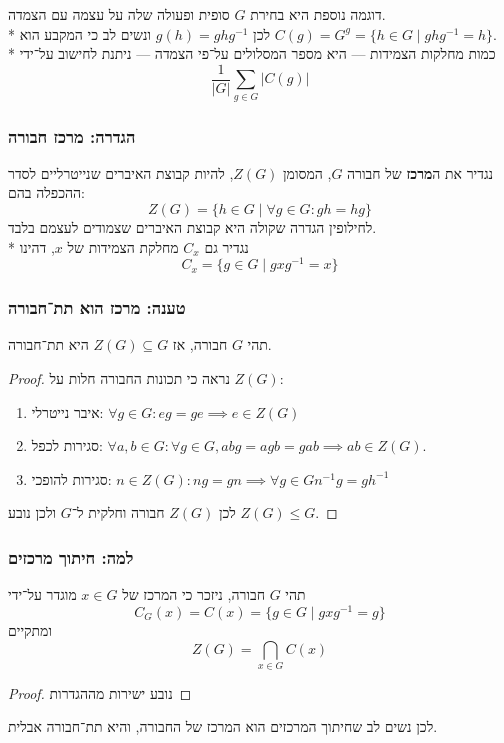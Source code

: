 דוגמה נוספת היא בחירת $G$ סופית ופעולה שלה על עצמה עם הצמדה. \\*
לכן $g(h) = ghg^{-1}$ ונשים לב כי המקבע הוא $C(g) = G^g = \{ h \in G \mid ghg^{-1} = h\}$. \\*
כמות מחלקות הצמידות --- היא מספר המסלולים על־פי הצמדה --- ניתנת לחישוב על־ידי
\[
	\frac{1}{|G|} \sum_{g \in G} |C(g)|
\]

\subsubsection{הגדרה: מרכז חבורה}
נגדיר את ה\textbf{מרכז} של חבורה $G$, המסומן $Z(G)$, להיות קבוצת האיברים שנייטרליים לסדר ההכפלה בהם:
\[
	Z(G) = \{ h \in G \mid \forall g \in G : g h = h g\}
\]
לחילופין הגדרה שקולה היא קבוצת האיברים שצמודים לעצמם בלבד. \\*
נגדיר גם $C_x$ מחלקת הצמידות של $x$, דהינו
\[
	C_x = \{ g \in G \mid g x g^{-1} = x \}
\]

\subsubsection{טענה: מרכז הוא תת־חבורה}
תהי $G$ חבורה, אז $Z(G) \subseteq G$ היא תת־חבורה.
\begin{proof}
	נראה כי תכונות החבורה חלות על $Z(G)$:
	\begin{enumerate}
		\item איבר נייטרלי: $\forall g \in G: eg = ge \implies e \in Z(G)$
		\item סגירות לכפל: $\forall a, b \in G : \forall g \in G, a b g = a g b = g a b \implies ab \in Z(G)$.
		\item סגירות להופכי: $n \in Z(G) : ng = gn \implies \forall g \in G n^{-1} g = g h^{-1}$
	\end{enumerate}
	לכן $Z(G)$ חבורה וחלקית ל־$G$ ולכן נובע $Z(G) \le G$.
\end{proof}

\subsubsection{למה: חיתוך מרכזים}
תהי $G$ חבורה, ניזכר כי המרכז של $x \in G$ מוגדר על־ידי
\[
	C_G(x) = C(x) = \{ g \in G \mid g x g^{-1} = g \}
\]
ומתקיים
\[
	Z(G) = \bigcap_{x \in G} C(x)
\]
\begin{proof}
	נובע ישירות מההגדרות
\end{proof}
לכן נשים לב שחיתוך המרכזים הוא המרכז של החבורה, והיא תת־חבורה אבלית.

